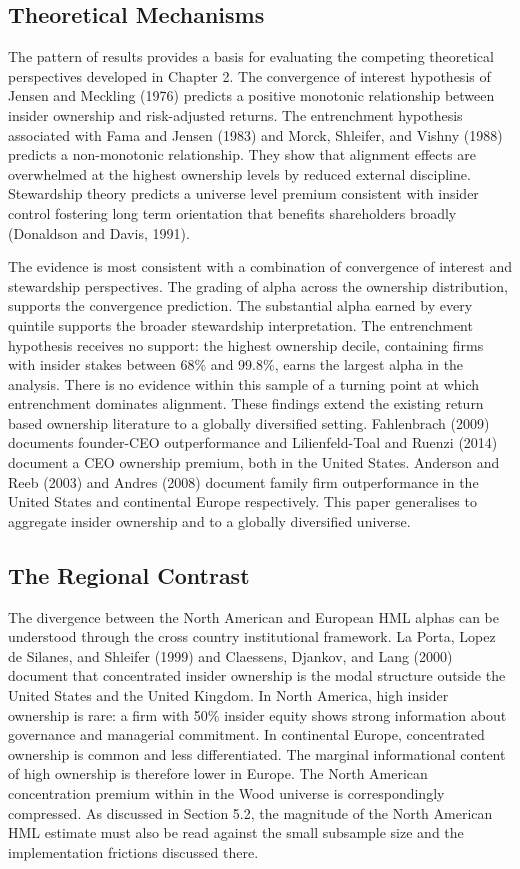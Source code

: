 \subsection{Theoretical Mechanisms}

The pattern of results provides a basis for evaluating the competing theoretical perspectives developed in Chapter 2. The convergence of interest hypothesis of Jensen and Meckling (1976) predicts a positive monotonic relationship between insider ownership and risk-adjusted returns. The entrenchment hypothesis associated with Fama and Jensen (1983) and Morck, Shleifer, and Vishny (1988) predicts a non-monotonic relationship. They show that alignment effects are overwhelmed at the highest ownership levels by reduced external discipline. Stewardship theory predicts a universe level premium consistent with insider control fostering long term orientation that benefits shareholders broadly (Donaldson and Davis, 1991).

The evidence is most consistent with a combination of convergence of interest and stewardship perspectives. The grading of alpha across the ownership distribution, supports the convergence prediction. The substantial alpha earned by every quintile supports the broader stewardship interpretation. The entrenchment hypothesis receives no support: the highest ownership decile, containing firms with insider stakes between 68\% and 99.8\%, earns the largest alpha in the analysis. There is no evidence within this sample of a turning point at which entrenchment dominates alignment. These findings extend the existing return based ownership literature to a globally diversified setting. Fahlenbrach (2009) documents founder-CEO outperformance and Lilienfeld-Toal and Ruenzi (2014) document a CEO ownership premium, both in the United States. Anderson and Reeb (2003) and Andres (2008) document family firm outperformance in the United States and continental Europe respectively. This paper generalises to aggregate insider ownership and to a globally diversified universe.


\subsection{The Regional Contrast}

The divergence between the North American and European HML alphas can be understood through the cross country institutional framework. La Porta, Lopez de Silanes, and Shleifer (1999) and Claessens, Djankov, and Lang (2000) document that concentrated insider ownership is the modal structure outside the United States and the United Kingdom. In North America, high insider ownership is rare: a firm with 50\% insider equity shows strong information about governance and managerial commitment. In continental Europe, concentrated ownership is common and less differentiated. The marginal informational content of high ownership is therefore lower in Europe. The North American concentration premium within in the Wood universe is correspondingly compressed. As discussed in Section 5.2, the magnitude of the North American HML estimate must also be read against the small subsample size and the implementation frictions discussed there.

